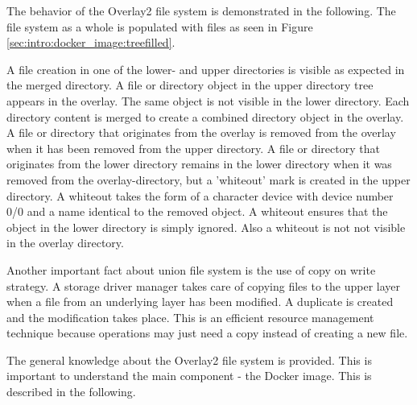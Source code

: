 The behavior of the Overlay2 file system is demonstrated in the following.
The file system as a whole is populated with files as seen in Figure \ref{sec:intro:docker_image:treefilled}.

A file creation in one of the lower- and upper directories is visible as expected in the merged directory.
A file or directory object in the upper directory tree appears in the overlay. The same object is not visible in the lower directory.
Each directory content is merged to create a combined directory object in the overlay.
A file or directory that originates from the overlay is removed from the overlay when it has been removed from the upper directory. 
A file or directory that originates from the lower directory remains in the lower directory when it was removed from the overlay-directory, but a 'whiteout' mark is created in the upper directory. A whiteout takes the form of a character device with device number 0/0 and a name identical to the removed object. A whiteout ensures that the object in the lower directory is simply ignored. Also a whiteout is not not visible in the overlay directory. 

Another important fact about union file system is the use of copy on write strategy. 
A storage driver manager takes care of copying files to the upper layer when a file from an underlying layer has been modified. A duplicate is created and the modification takes place. This is an efficient resource management technique because operations may just need a copy instead of creating a new file.
	
The general knowledge about the Overlay2 file system is provided. This is important to understand the main component - the Docker image. This is described in the following.